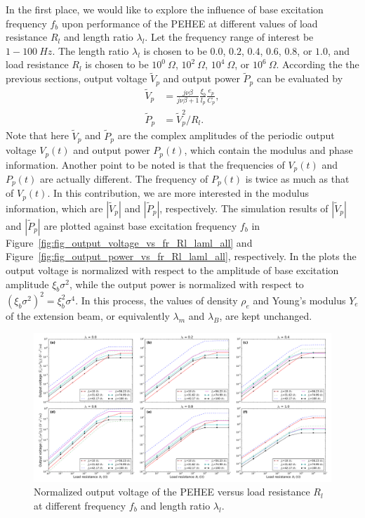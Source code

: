 \documentclass{elsarticle}
\begin{document}
In the first place, we would like to explore the influence of base excitation frequency $f_b$ upon performance of the PEHEE at different values of load resistance $R_l$ and length ratio $\lambda_l$. Let the frequency range of interest be $1 - 100\ Hz$. The length ratio $\lambda_l$ is chosen to be $0.0$, $0.2$, $0.4$, $0.6$, $0.8$, or $1.0$, and load resistance $R_l$ is chosen to be $10^0\ \Omega$, $10^2\ \Omega$, $10^4\ \Omega$, or $10^6\ \Omega$. According the the previous sections, output voltage $\tilde{V}_p$ and output power $\tilde{P}_p$ can be evaluated by
\begin{equation}
    \begin{aligned}
        \tilde{V}_p &= \frac{j \nu \beta}{j \nu \beta + 1} \frac{\xi_b}{l_p} \frac{e_p}{C_p}, \\
        \tilde{P}_p &=  \tilde{V}_p^2 / R_l.
    \end{aligned}
\end{equation}
Note that here $\tilde{V}_p$ and $\tilde{P}_p$ are the complex amplitudes of the periodic output voltage $V_p(t)$ and output power $P_p(t)$, which contain the modulus and phase information. Another point to be noted is that the frequencies of $V_p(t)$ and $P_p(t)$ are actually different. The frequency of $P_p(t)$ is twice as much as that of $V_p(t)$. In this contribution, we are more interested in the modulus information, which are $|\tilde{V}_p|$ and $|\tilde{P}_p|$, respectively. The simulation results of $|\tilde{V}_p|$ and $|\tilde{P}_p|$ are plotted against base excitation frequency $f_b$ in Figure~\ref{fig:fig_output_voltage_vs_fr_Rl_laml_all} and Figure~\ref{fig:fig_output_power_vs_fr_Rl_laml_all}, respectively. In the plots the output voltage is normalized with respect to the amplitude of base excitation amplitude $\xi_b \sigma^2$, while the output power is normalized with respect to $\left(\xi_b \sigma^2\right)^2 = \xi_b^2 \sigma^4$. In this process, the values of density $\rho_e$ and Young's modulus $Y_e$ of the extension beam, or equivalently $\lambda_m$ and $\lambda_B$, are kept unchanged.



\begin{figure}[!htbp]
    \centering
    \includegraphics[width=\textwidth]{./fig_vol_laml_list_vs_fr_Rl}
    \caption{ Normalized output voltage of the PEHEE versus load resistance $R_l$ at different frequency $f_b$ and length ratio $\lambda_l$. }
    \label{fig:fig_vol_laml_list_vs_fr_Rl}
\end{figure}
\end{document}
